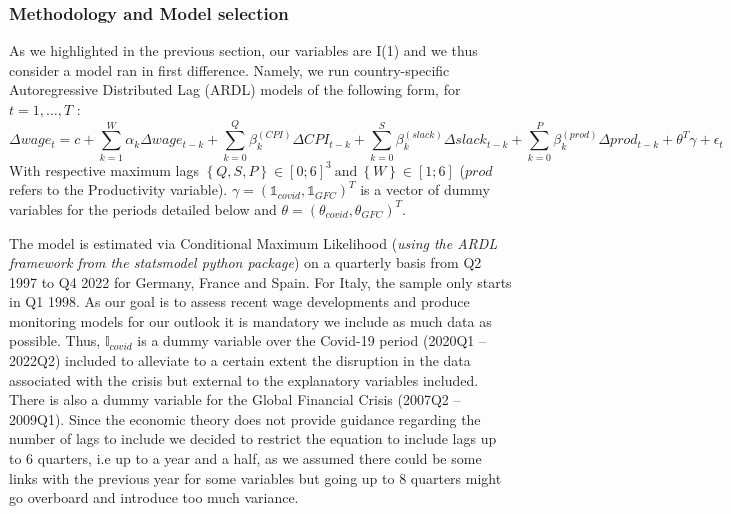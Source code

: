 \subsubsection{Methodology and Model selection}
\quad As we highlighted in the previous section, our variables are I(1) and we thus consider a model ran in first difference. 
Namely, we run country-specific Autoregressive Distributed Lag (ARDL) models of the following form, for $t=1,\ldots,T$ :
\begin{equation*}
    \Delta wage_{t} = c + \sum_{k=1}^{W}\alpha_k \Delta wage_{t-k} + \sum_{k=0}^{Q}\beta_k^{(CPI)} \Delta CPI_{t-k} + \sum_{k=0}^{S}\beta_k^{(slack)} \Delta slack_{t-k} + \sum_{k=0}^{P}\beta_k^{(prod)} \Delta prod_{t-k} + \theta^{T}\gamma + \epsilon_{t}
\end{equation*}
With respective maximum lags $\left\{Q,S,P\right\}\in\left[0;6\right]^{3}\ \textrm{and}\ \left\{W\right\}\in\left[1;6\right]$ ($prod$ refers to the Productivity variable).
$\gamma = (\mathbb{1}_{covid}, \mathbb{1}_{GFC})^{T}$ is a vector of dummy variables for the periods detailed below and $\theta = (\theta_{covid},\theta_{GFC})^{T}$.

The model is estimated via Conditional Maximum Likelihood (\textit{using the ARDL framework from the statsmodel python package}) on a quarterly basis from Q2 1997 to Q4 2022 for Germany, France and Spain. 
For Italy, the sample only starts in Q1 1998. As our goal is to assess recent wage developments and produce monitoring models for our outlook it is mandatory we include as much data as possible. 
Thus, $\mathbb{I}_{covid}$ is a dummy variable over the Covid-19 period (2020Q1 – 2022Q2) included to alleviate to a certain extent the disruption in the data associated with the crisis but external to the explanatory variables included. 
There is also a dummy variable for the Global Financial Crisis (2007Q2 – 2009Q1). 
Since the economic theory does not provide guidance regarding the number of lags to include we decided to restrict the equation to include lags up to 6 quarters, i.e up to a year and a half, as we assumed there could be some links with the previous year for some variables but going up to 8 quarters might go overboard and introduce too much variance.

